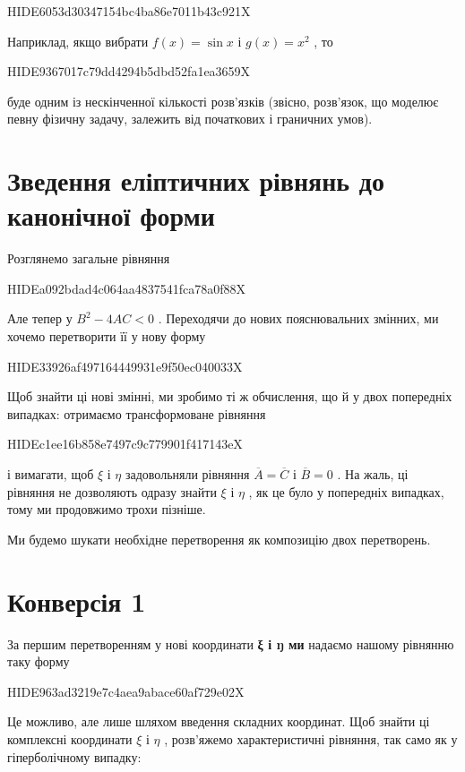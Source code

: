 \documentclass[
  ukrainian,
]{article}
\begin{document}
HIDE6053d30347154bc4ba86e7011b43c921X

Наприклад, якщо вибрати \(f(x) = \sin x\) і \(g(x) = x^2\) , то

HIDE9367017c79dd4294b5dbd52fa1ea3659X

буде одним із нескінченної кількості розв'язків (звісно, розв'язок, що
моделює певну фізичну задачу, залежить від початкових і граничних умов).

\section{Зведення еліптичних рівнянь до канонічної
форми}\label{ux437ux432ux435ux434ux435ux43dux43dux44f-ux435ux43bux456ux43fux442ux438ux447ux43dux438ux445-ux440ux456ux432ux43dux44fux43dux44c-ux434ux43e-ux43aux430ux43dux43eux43dux456ux447ux43dux43eux457-ux444ux43eux440ux43cux438-1}

Розглянемо загальне рівняння

HIDEa092bdad4c064aa4837541fca78a0f88X

Але тепер у \(B^2-4AC<0\) . Переходячи до нових пояснювальних змінних,
ми хочемо перетворити її у нову форму

HIDE33926af497164449931e9f50ec040033X

Щоб знайти ці нові змінні, ми зробимо ті ж обчислення, що й у двох
попередніх випадках: отримаємо трансформоване рівняння

HIDEc1ee16b858e7497c9c779901f417143eX

і вимагати, щоб \(\xi\) і \(\eta\) задовольняли рівняння
\(\overline{A}=\overline{C}\) і \(\overline{B}=0\) . На жаль, ці
рівняння не дозволяють одразу знайти \(\xi\) і \(\eta\) , як це було у
попередніх випадках, тому ми продовжимо трохи пізніше.

Ми будемо шукати необхідне перетворення як композицію двох перетворень.

\section{Конверсія
1}\label{ux43aux43eux43dux432ux435ux440ux441ux456ux44f-1-1}

За першим перетворенням у нові координати \textbf{ξ і ŋ ми} надаємо
нашому рівнянню таку форму

HIDE963ad3219e7c4aea9abace60af729e02X

Це можливо, але лише шляхом введення складних координат. Щоб знайти ці
комплексні координати \(\xi\) і \(\eta\) , розв'яжемо характеристичні
рівняння, так само як у гіперболічному випадку:
\end{document}
